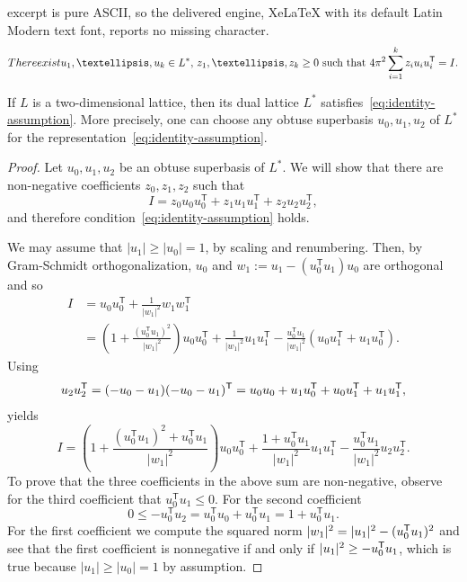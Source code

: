 \documentclass[10pt,a4paper]{amsart}
\begin{document}
excerpt is pure ASCII, so the delivered engine, XeLaTeX with its default Latin Modern text font, reports no missing character.
\begin{align}\label{eq:identity-assumption}
	\textup{There exist } u_1,\ldots, u_k \in L^*,  \, z_1,\ldots,z_k \ge 0 \text{ such that }
	4\pi^2 \sum_{i = 1}^k z_i u_i u_i^{\sf T} = I.
\end{align}

\begin{lemma}
  \label{lemma:id-decomp-for-2d-case}
  If $L$ is a two-dimensional lattice, then its dual lattice
  $L^*$ satisfies~\eqref{eq:identity-assumption}. More precisely, one can choose any obtuse superbasis $u_0,u_1,u_2$ of $L^*$ for
  the representation~\eqref{eq:identity-assumption}.
\end{lemma}

\begin{proof}
  Let $u_0,u_1,u_2$ be an obtuse superbasis of $L^*$.  We will show
  that there are non-negative coefficients $z_0, z_1, z_2$ such that
 \[
   I = z_0 u_0u_0^\mathsf{T} + z_1 u_1u_1^\mathsf{T} + z_2
   u_2u_2^\mathsf{T} ,
\]
and therefore condition~\eqref{eq:identity-assumption} holds.

We may assume that $|u_1| \geq |u_0| = 1$, by
scaling and renumbering. Then, by Gram-Schmidt orthogonalization,
$u_0$ and $w_1 := u_1 - (u_0^\mathsf{T} u_1) u_0$ are orthogonal and
so
\[
\begin{split}
  I & = u_0 u_0^\mathsf{T} + \frac{1}{|w_1|^2}w_1w_1^\mathsf{T}\\
  & = \left(1+\frac{ (u_0^\mathsf{T} u_1)^2}{|w_1|^2}\right) u_0u_0^\mathsf{T} +
  \frac{1}{|w_1|^2} u_1u_1^\mathsf{T} - \frac{u_0^\mathsf{T}
    u_1}{|w_1|^2}(u_0u_1^\mathsf{T}+u_1u_0^\mathsf{T}).
\end{split}
\]
Using
\[
  u_2 u_2^{\sf T} = (-u_0 - u_1) (-u_0 - u_1)^{\sf T} = u_0 u_0 + u_1 u_0^{\sf T} + u_0
  u_1^{\sf T} + u_1 u_1^{\sf T},
\]
yields
\[
I =\left(1+\frac{ (u_0^\mathsf{T} u_1)^2 +
    u_0^\mathsf{T}u_1}{|w_1|^2}\right)u_0u_0^\mathsf{T} +\frac{1+
  u_0^\mathsf{T}u_1}{|w_1|^2}u_1u_1^\mathsf{T} - \frac{ u_0^\mathsf{T} u_1}{|w_1|^2}u_2u_2^\mathsf{T}.
\]
To prove that the three coefficients in the above sum are
non-negative, observe for the third coefficient that $u_0^\mathsf{T}u_1 \le 0
$. For the second coefficient
\[
0 \le  - u_0^\mathsf{T}u_2  = u_0^\mathsf{T}u_0 + u_0^\mathsf{T} u_1 =
1 +u_0^\mathsf{T} u_1.
\]
For the first coefficient we compute the squared norm $|w_1|^2 =
|u_1|^2 - (u_0^{\sf T} u_1)^2$ and see that the first coefficient is
nonnegative if and only if $|u_1|^2 \geq -u_0^{\sf T} u_1$, which is
true because $|u_1| \geq |u_0| = 1$ by assumption.
\end{proof}
\end{document}

